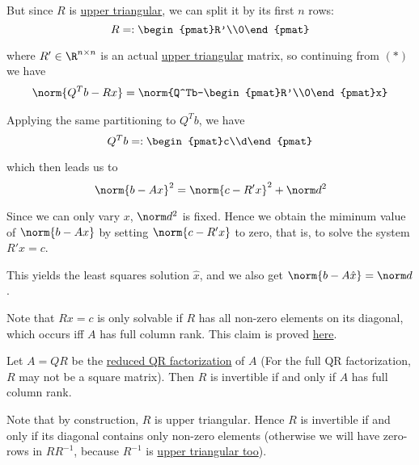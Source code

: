 But since $R$ is \href{c39b6bf}{upper triangular}, we can split it by its first
$n$ rows:
$$
  R=:\begin{pmat}R'\\0\end{pmat}
$$

where $R'\in\R^{n\times n}$ is an actual \href{c39b6bf}{upper triangular}
matrix, so continuing from $(*)$ we have
\begin{align*}
  \norm{Q^Tb-Rx}=\norm{Q^Tb-\begin{pmat}R'\\0\end{pmat}x}
\end{align*}

Applying the same partitioning to $Q^Tb$, we have
$$
  Q^Tb=:\begin{pmat}c\\d\end{pmat}
$$

which then leads us to
$$
  \norm{b-Ax}^2=\norm{c-R'x}^2+\norm d^2
$$

Since we can only vary $x$, $\norm d^2$ is fixed. Hence we obtain the miminum
value of $\norm{b-Ax}$ by setting $\norm{c-R'x}$ to zero, that is, to solve the
system $R'x=c$.

This yields the least squares solution $\hat x$, and we also get $\norm{b-A\hat
x}=\norm d$.

Note that $Rx=c$ is only solvable if $R$ has all non-zero elements on its
diagonal, which occurs iff $A$ has full column rank. This claim is proved
\href{c998eda}{here}.

\label{c998eda}

Let $A=QR$ be the \href{f544868}{reduced QR factorization} of $A$ (For the full
QR factorization, $R$ may not be a square matrix). Then $R$ is invertible if
and only if $A$ has full column rank.

Note that by construction, $R$ is upper triangular. Hence $R$ is invertible if
and only if its diagonal contains only non-zero elements (otherwise we will
have zero-rows in $RR^{-1}$, because $R^{-1}$ is \href{a8f4ca9}{upper
triangular too}).

